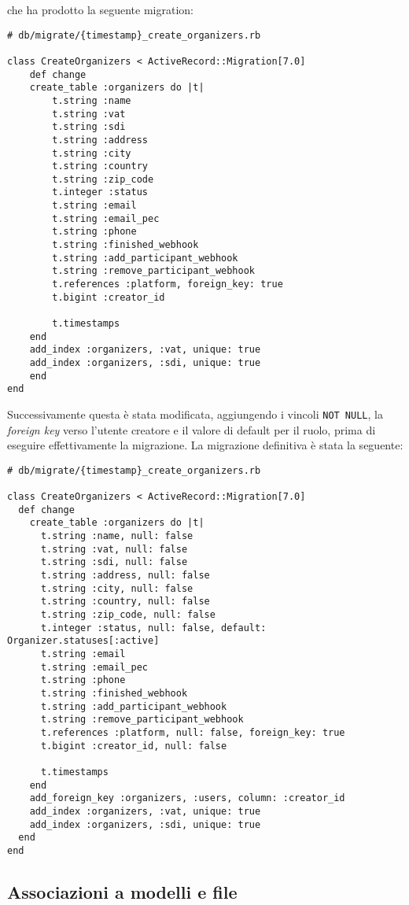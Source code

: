 che ha prodotto la seguente migration:
\begin{verbatim}
# db/migrate/{timestamp}_create_organizers.rb

class CreateOrganizers < ActiveRecord::Migration[7.0]
	def change
	create_table :organizers do |t|
		t.string :name
		t.string :vat
		t.string :sdi
		t.string :address
		t.string :city
		t.string :country
		t.string :zip_code
		t.integer :status
		t.string :email
		t.string :email_pec
		t.string :phone
		t.string :finished_webhook
		t.string :add_participant_webhook
		t.string :remove_participant_webhook
		t.references :platform, foreign_key: true
		t.bigint :creator_id

		t.timestamps
	end
	add_index :organizers, :vat, unique: true
	add_index :organizers, :sdi, unique: true
	end
end
\end{verbatim}
Successivamente questa è stata modificata, aggiungendo i vincoli \verb|NOT NULL|, la \emph{foreign key} verso l'utente creatore e il valore di default per il ruolo, prima di eseguire effettivamente la migrazione. La migrazione definitiva è stata la seguente:
\begin{verbatim}
# db/migrate/{timestamp}_create_organizers.rb

class CreateOrganizers < ActiveRecord::Migration[7.0]
  def change
    create_table :organizers do |t|
      t.string :name, null: false
      t.string :vat, null: false
      t.string :sdi, null: false
      t.string :address, null: false
      t.string :city, null: false
      t.string :country, null: false
      t.string :zip_code, null: false
      t.integer :status, null: false, default: Organizer.statuses[:active]
      t.string :email
      t.string :email_pec
      t.string :phone
      t.string :finished_webhook
      t.string :add_participant_webhook
      t.string :remove_participant_webhook
      t.references :platform, null: false, foreign_key: true
      t.bigint :creator_id, null: false

      t.timestamps
    end
    add_foreign_key :organizers, :users, column: :creator_id
    add_index :organizers, :vat, unique: true
    add_index :organizers, :sdi, unique: true
  end
end
\end{verbatim}

\subsection{Associazioni a modelli e file}

